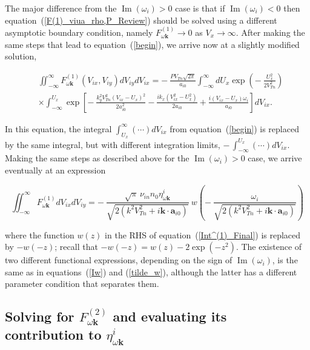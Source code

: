 \documentclass[draft]{agujournal2019}
\renewcommand{\vec}{\mathbf}
\begin{document}
{The major difference from the $\operatorname{Im}(\omega_i)>0$ case is that if $\operatorname{Im}(\omega_i)<0$
then equation~(\ref{F(1)_viua_rho,P_Review}) should be solved using a different 
asymptotic boundary condition, namely $F_{\omega\vec{k}}^{(1)}\rightarrow0$ as $V_{x}\rightarrow\infty$. 
After making the same steps that lead to equation~(\ref{begin}), we arrive now at a slightly modified solution,
\begin{linenomath*}
\begin{align}
&  \iint_{-\infty}^{\infty}F_{\omega\vec{k}}^{(1)}(V_{ix},V_{iy}%
)dV_{iy}dV_{ix}=-\ \frac{PV_{Tn}\sqrt{2\pi}}{a_{i0}}\int_{-\infty}^{\infty
}dU_{x}\exp\left(  -\ \frac{U_{x}^{2}}{2V_{Tn}^{2}}\right) \nonumber\\
&  \times\int_{-\infty}^{U_{x}}\exp\left[  -\ \frac{k_{y}^{2}V_{Tn}^{2}\left(
V_{ix}-U_{x}\right)  ^{2}}{2a_{i0}^{2}}-\frac{ik_{x}\left(  V_{ix}^{2}%
-U_{x}^{2}\right)  }{2a_{i0}}+\frac{i\left(  V_{ix}-U_{x}\right)  \omega_{i}%
}{a_{i0}}\right]  dV_{ix}.
\label{begin-}
\end{align}
\end{linenomath*}
In this equation, the integral $\int_{U_x}^{\infty}(\cdots)dV_{ix}$ from equation~(\ref{begin}) 
is replaced by the same integral, but with different integration limits, $-\,\int_{-\infty}^{U_x}(\cdots)dV_{ix}$. Making the 
same steps as described above for the $\operatorname{Im}(\omega_i)>0$ case, we arrive eventually at an expression 
\begin{linenomath*}
\begin{equation}
\iint_{-\infty}^{\infty}F_{\omega\vec{k}}^{(1)}dV_{ix}dV_{iy}=-\ \frac{\sqrt
{\pi}\,\nu_{in}n_{0}\eta_{\omega\vec{k}}^{i}}{\sqrt{2(k^{2}V_{Tn}^{2}+i\vec
{k}\cdot\vec{a}_{i0})}}\ w\left(-\ \frac{\omega_{i}}{\sqrt{2(k^{2}V_{Tn}^{2}+i\vec{k}\cdot\vec{a}_{i0})}}\right) 
\label{Int^(1)_Final_-}
\end{equation}
\end{linenomath*}
where the function $w(z)$ in the RHS of equation~(\ref{Int^(1)_Final}) is replaced by $-w(-z)$; 
recall that $-w(-z)=w(z)-2\exp(-z^{2})$. The existence of two different functional expressions, 
depending on the sign of $\operatorname{Im}(\omega_i)$, is the same as in equations~(\ref{Iw}) 
and (\ref{tilde_w}), although the latter has a different parameter condition that separates them.

\subsection{Solving for $F_{\omega\vec{k}}^{(2)}$ and evaluating its
contribution to $\eta_{\omega\vec{k}}^{i}$%
\label{Solving for F_2 and evaluating its contribution to eta_i}}

}
\end{document}
